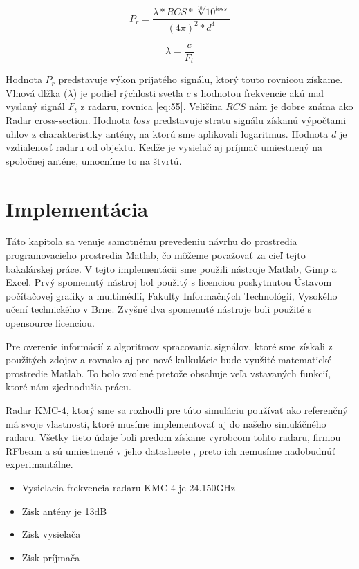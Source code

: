       \begin{equation} %
        P_{r} = \frac{\lambda * RCS * \sqrt[10]{10^{loss}}}{(4\pi)^{2} * d^{4}}
      \end{equation}   

      \begin{equation} %
        \lambda = \frac{c}{F_{t}}
      \end{equation}         

      Hodnota $P_{r}$ predstavuje výkon prijatého signálu, ktorý touto rovnicou získame. Vlnová dlžka ($\lambda$) je podiel rýchlosti svetla $c$ s hodnotou frekvencie akú mal vyslaný signál $F_{t}$ z radaru, rovnica \ref{eq:55}. Veličina $RCS$ nám je dobre známa ako Radar cross-section. Hodnota $loss$ predstavuje stratu signálu získanú výpočtami uhlov z charakteristiky antény, na ktorú sme aplikovali logaritmus.
      Hodnota $d$ je vzdialenosť radaru od objektu. Kedže je vysielač aj príjmač umiestnený na spoločnej anténe, umocníme to na štvrtú.


\chapter{Implementácia}
  \hspace{0.6cm}Táto kapitola sa venuje samotnému prevedeniu návrhu do prostredia programovacieho prostredia Matlab, čo môžeme považovať za cieľ tejto bakalárskej práce. V tejto implementácii sme použili nástroje Matlab, Gimp a Excel. Prvý spomenutý nástroj bol použitý s licenciou poskytnutou Ústavom počítačovej grafiky a multimédií, Fakulty Informačných Technológií, Vysokého učení technického v Brne. Zvyšné dva spomenuté nástroje boli použité s opensource licenciou.

  Pre overenie informácií z algoritmov spracovania signálov, ktoré sme získali z použitých zdojov a rovnako aj pre nové kalkulácie bude využité matematické prostredie Matlab. To bolo zvolené pretože obsahuje veľa vstavaných funkcií, ktoré nám zjednodušia prácu.  

  Radar KMC-4, ktorý sme sa rozhodli pre túto simuláciu používať ako referenčný má svoje vlastnosti, ktoré musíme implementovať aj do našeho simuláčného radaru. Všetky tieto údaje boli predom získane vyrobcom tohto radaru, firmou RFbeam a sú umiestnené v jeho datasheete \cite{kmc4sheet}, preto ich nemusíme nadobudnúť experimantálne.

  \begin{itemize}
    \item Vysielacia frekvencia radaru KMC-4 je 24.150GHz
    \item Zisk antény je 13dB
    \item Zisk vysielača
    \item Zisk príjmača
  \end{itemize}  

